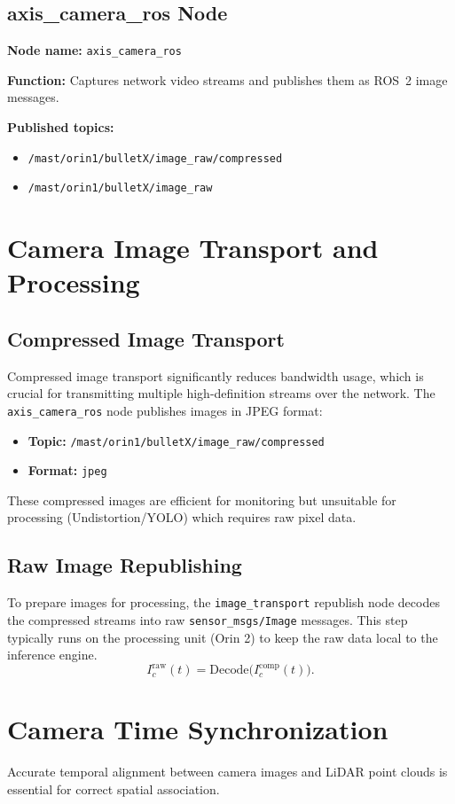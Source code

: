 \documentclass[12pt,a4paper]{report}
\begin{document}
\subsection{axis\_camera\_ros Node}
\textbf{Node name:} \texttt{axis\_camera\_ros}

\textbf{Function:} Captures network video streams and publishes them as ROS~2 image messages.

\textbf{Published topics:}
\begin{itemize}
    \item \texttt{/mast/orin1/bulletX/image\_raw/compressed}
    \item \texttt{/mast/orin1/bulletX/image\_raw}
\end{itemize}

\section{Camera Image Transport and Processing}
\subsection{Compressed Image Transport}
Compressed image transport significantly reduces bandwidth usage, which is crucial for transmitting multiple high-definition streams over the network. The \texttt{axis\_camera\_ros} node publishes images in JPEG format:
\begin{itemize}
    \item \textbf{Topic:} \texttt{/mast/orin1/bulletX/image\_raw/compressed}
    \item \textbf{Format:} \texttt{jpeg}
\end{itemize}
These compressed images are efficient for monitoring but unsuitable for processing (Undistortion/YOLO) which requires raw pixel data.

\subsection{Raw Image Republishing}
To prepare images for processing, the \texttt{image\_transport} republish node decodes the compressed streams into raw \texttt{sensor\_msgs/Image} messages. This step typically runs on the processing unit (Orin 2) to keep the raw data local to the inference engine.
\begin{equation}
I_c^{\mathrm{raw}}(t) = \mathrm{Decode}\bigl(I_c^{\mathrm{comp}}(t)\bigr).
\end{equation}

\section{Camera Time Synchronization}
Accurate temporal alignment between camera images and LiDAR point clouds is essential for correct spatial association.
\end{document}
